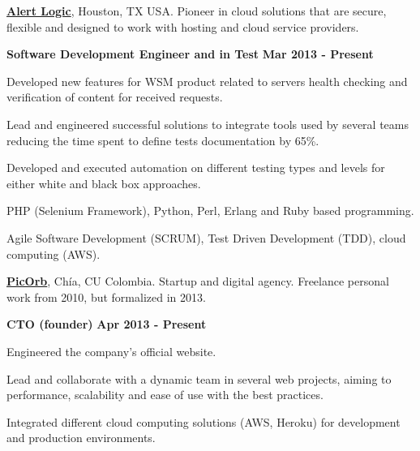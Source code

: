 
\href{http://alertlogic.com/}{\textbf{Alert Logic}}, Houston, TX USA. Pioneer in
cloud solutions that are secure, flexible and designed to work with hosting and cloud service providers.
\begin{outerlist}
\item[] \textbf{Software Development Engineer and in Test} \hfill \textbf{Mar
2013 - Present}
    \begin{innerlist}
\item Developed new features for WSM product related to servers
health checking and verification of content for received requests.
\item Lead and engineered successful solutions to integrate tools
used by several teams reducing the time spent to define tests documentation by 65\%.
\item Developed and executed automation on different testing types and levels
for either white and black box approaches.
\item PHP (Selenium Framework), Python, Perl, Erlang and Ruby based programming.
\item Agile Software Development (SCRUM), Test Driven Development (TDD), cloud
computing (AWS).
    \end{innerlist}
\end{outerlist}

\quarterblankline

\href{http://www.picorb.com/}{\textbf{PicOrb}}, Ch\'ia, CU Colombia. Startup
and digital agency. Freelance personal work from 2010, but formalized in 2013.
\begin{outerlist}
\item[] \textbf{CTO (founder)} \hfill \textbf{Apr 2013 -
Present}
    \begin{innerlist}
\item Engineered the company's official website.
\item Lead and collaborate with a dynamic team in several
web projects, aiming to performance, scalability and ease of use with
the best practices.
\item Integrated different cloud computing solutions (AWS, Heroku) for
development and production environments.
    \end{innerlist}
\end{outerlist}

\quarterblankline

